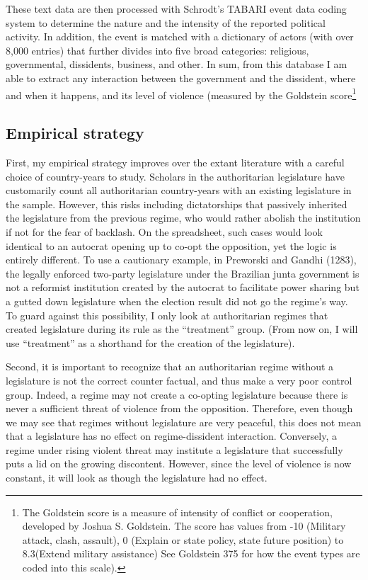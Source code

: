 \begin{itemize}
These text data are then processed with Schrodt's TABARI event data coding system to determine the nature and the intensity of the reported political activity. In addition, the event is matched with a dictionary of actors (with over 8,000 entries) that further divides into five broad categories: religious, governmental, dissidents, business, and other. In sum, from this database I am able to extract any interaction between the government and the dissident, where and when it happens, and its level of violence (measured by the Goldstein score\footnote{The Goldstein score is a measure of intensity of conflict or cooperation, developed by Joshua S. Goldstein. The score has values from -10 (Military attack, clash, assault), 0 (Explain or state policy, state future position) to 8.3(Extend military assistance) See Goldstein 375 for how the event types are coded into this scale).}
\end{itemize}

\subsection{Empirical strategy}

First, my empirical strategy improves over the extant literature with a careful choice of country-years to study. Scholars in the authoritarian legislature have customarily count all authoritarian country-years with an existing legislature in the sample. However, this risks including dictatorships that passively inherited the legislature from the previous regime, who would rather abolish the institution if not for the fear of backlash. On the spreadsheet, such cases would look identical to an autocrat opening up to co-opt the opposition, yet the logic is entirely different. To use a cautionary example, in Preworski and Gandhi (1283), the legally enforced two-party legislature under the Brazilian junta government is not a reformist institution created by the autocrat to facilitate power sharing but a gutted down legislature when the election result did not go the regime's way. To guard against this possibility, I only look at authoritarian regimes that created  legislature during its rule as the ``treatment'' group. (From now on, I will use ``treatment'' as a shorthand for the creation of the legislature).

Second, it is important to recognize that an authoritarian regime without a legislature is not the correct counter factual, and thus make a very poor control group. Indeed, a regime may not create a co-opting legislature because there is never a sufficient threat of violence from the opposition. Therefore, even though we may see that regimes without legislature are very peaceful, this does not mean that a legislature has no effect on regime-dissident interaction. Conversely, a regime under rising violent threat may institute a legislature that successfully puts a lid on the growing discontent. However, since the level of violence is now constant, it will look as though the legislature had no effect.

